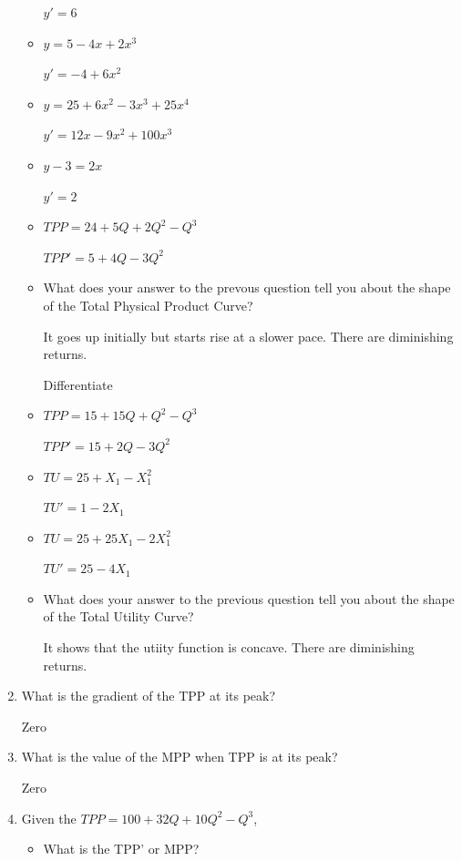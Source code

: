 \documentclass[12pt, a4paper, oneside]{article}\usepackage[]{graphicx}\usepackage[]{color}
\begin{document}
\begin{enumerate}
\begin{itemize}
$y' = 6$

\item $y = 5 - 4x +2x^3$

$y' = -4 + 6x^2$

\item $y = 25 +6x^2 - 3x^3 +25x^4$

$y' =  12x -9x^2 +100x^3$

\item $y - 3 = 2x$

$y' = 2$

\item $TPP = 24 +5Q +2Q^2 - Q^3$

$TPP' =  5 +4Q - 3Q^2$

\item What does your answer to the prevous question tell you about the shape of the Total Physical Product Curve? 

It goes up initially but starts rise at a slower pace.  There are diminishing returns.  

Differentiate

\item $TPP = 15 +15Q +Q^2 - Q^3$

$TPP' = 15 + 2Q - 3Q^2$

\item $TU = 25 + X_1 - X_1^2$

$TU' = 1 - 2X_1$

\item $TU = 25 +25X_1 -2X_1^2$

$TU' = 25 - 4X_1$

\item What does your answer to the previous question tell you about the shape of the Total Utility Curve? 

It shows that the utiity function is concave.  There are diminishing returns. 

\end{itemize}

\item What is the gradient of the TPP at its peak? 

Zero

\item What is the value of the MPP when TPP is at its peak? 

Zero

\item Given the $TPP = 100 + 32Q +10Q^2 - Q^3$, 
\begin{itemize}
\item What is the TPP' or MPP?


\end{itemize}
\end{enumerate}
\end{document}
